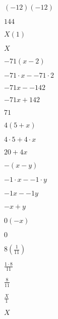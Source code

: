 \documentclass{article}
\begin{document}
\begin{enumerate}[start=28]
    \item $(-12)(-12)$
    \begin{center}
        \item $144$
    \end{center}

    \item $X(1)$
    \begin{center}
        \item $X$
    \end{center}

    \item $-71(x - 2)$
    \begin{center}
        \item $-71 \cdot x - -71 \cdot 2$
        \item $-71x - -142$
        \item $-71x + 142$
        \item $71$
    \end{center}

    \item $4(5 + x)$
    \begin{center}
        \item $4 \cdot 5 + 4 \cdot x$
        \item $20 + 4x$
    \end{center}

    \item $-(x - y)$
    \begin{center}
        \item $-1 \cdot x - -1 \cdot y$    
        \item $-1x - -1y$    
        \item $-x + y$    
    \end{center}

    \item $0(-x)$
    \begin{center}
        \item $0$
    \end{center}

    \item $8\left(\frac{1}{11}\right)$
    \begin{center}
        \item $\frac{1 \cdot 8}{11}$
        \item $\frac{8}{11}$
    \end{center}

    \item $\frac{X}{1}$
    \begin{center}
        \item $X$
    \end{center}


\end{enumerate}
\end{document}
